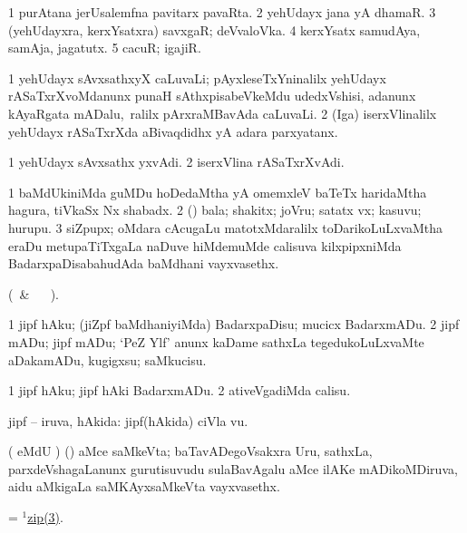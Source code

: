 \bentry
{} 
\gl{\nA} 
\bmng
\bnum
\num{1} purAtana jerUsalemfna pavitarx pavaRta. 
\num{2} yehUdayx jana yA dhamaR. 
\num{3} (yehUdayxra, kerxYsatxra) savxgaR; deVvaloVka.  
\num{4} kerxYsatx samudAya, samAja, jagatutx. 
\num{5} cacuR; igajiR.
\enum
\emng
\eentry

\bentry
{} 
\gl{\nA}
\bmng
\bnum
\num{1} yehUdayx sAvxsathxyX caLuvaLi; pAyxleseTxYninalilx yehUdayx rASaTxrXvoMdanunx punaH sAthxpisabeVkeMdu udedxVshisi, adanunx kAyaRgata mADalu, \,ralilx pArxraMBavAda caLuvaLi. 
\num{2} (Iga) iserxVlinalilx yehUdayx rASaTxrXda aBivaqdidhx  yA adara parxyatanx.
\enum
\emng
\eentry

\bentry
{} 
\gl{\nA} 
\bmng
\bnum
\num{1} yehUdayx sAvxsathx yxvAdi. 
\num{2} iserxVlina rASaTxrXvAdi.
\enum
\emng
\eentry

\bentry
{} 
\gl{\nA} 
\bmng
\bnum
\num{1} baMdUkiniMda  guMDu hoDedaMtha yA omemxleV baTeTx haridaMtha hagura, tiVkaSx Nx shabadx. 
\num{2} (\rUpa) bala; shakitx; joVru; satatx  vx; kasuvu; hurupu.  
\hypertarget{zip(1)3}{}
\num{3} siZpupx; oMdara cAcugaLu matotxMdaralilx toDarikoLuLxvaMtha  eraDu metupaTiTxgaLa naDuve hiMdemuMde calisuva kilxpipxniMda BadarxpaDisabahudAda baMdhani vayxvasethx.
\enum
\emng
\eentry

\bentry
{} 
\gl{\kirx} 
\bmng
(\BU\ \& \BUkaq\   \vakaq\ ).  
\emng

\noindent
\gl{\sakirx} 
\bmng
\bnum
\num{1} jipf hAku; (jiZpf baMdhaniyiMda) BadarxpaDisu; mucicx BadarxmADu. 
\num{2} jipf mADu; jipf mADu; `PeZ Ylf' anunx kaDame sathxLa tegedukoLuLxvaMte aDakamADu, kugigxsu; saMkucisu.
\enum
\emng

\noindent
\gl{\akirx}
\bmng
\bnum
\num{1} jipf hAku; jipf hAki  BadarxmADu. 
\num{2} ativeVgadiMda calisu.
\enum
\emng 
\eentry

\bentry
{} 
\gl{\gu} 
\bmng
jipf -- iruva, hAkida:  jipf(hAkida) ciVla \mo vu.
\emng
\eentry

\bentry
{} 
\gl{\nA}  
\bmng
( eMdU \parx) (\ame) aMce saMkeVta; baTavADegoVsakxra Uru, sathxLa, parxdeVshagaLanunx gurutisuvudu sulaBavAgalu aMce ilAKe mADikoMDiruva, aidu aMkigaLa saMKAyxsaMkeVta vayxvasethx.
\emng
\eentry

\bentry
{} 
\gl{\nA} 
\bmng
= \hyperlink{zip(1)3}{$^1$zip(3)}.
\emng
\eentry

